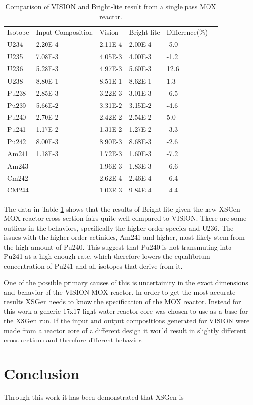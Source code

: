 \documentclass{article}
\begin{document}
\begin{table}[!htb]
\centering
\caption{Comparison of VISION and Bright-lite result from a single pass MOX reactor.}
\label{tab:g}
\begin{tabular}{llllll}
Isotope & Input Composition & Vision & Bright-lite & Difference(\%) \\
U234 & 2.20E-4 & 2.11E-4 & 2.00E-4 & -5.0\\
U235 & 7.08E-3 & 4.05E-3 & 4.00E-3 & -1.2\\
U236 & 5.28E-3 & 4.97E-3 & 5.60E-3 & 12.6\\
U238 & 8.80E-1 & 8.51E-1 & 8.62E-1 & 1.3\\
Pu238 & 2.85E-3 & 3.22E-3 & 3.01E-3 & -6.5\\
Pu239 & 5.66E-2 & 3.31E-2 & 3.15E-2 & -4.6\\
Pu240 & 2.70E-2 & 2.42E-2 & 2.54E-2 & 5.0\\
Pu241 & 1.17E-2 & 1.31E-2 & 1.27E-2 & -3.3\\
Pu242 & 8.00E-3 & 8.90E-3 & 8.68E-3 & -2.6\\
Am241 & 1.18E-3 & 1.72E-3 & 1.60E-3 & -7.2\\
Am243 & - & 1.96E-3 & 1.83E-3 & -6.6\\
Cm242 & - & 2.62E-4 & 2.46E-4 & -6.4\\
CM244 & - & 1.03E-3 & 9.84E-4 & -4.4
\end{tabular}
\end{table}

The data in Table \ref{tab:g} shows that the results of Bright-lite given the new XSGen MOX reactor cross section fairs quite well compared to VISION. There are some outliers in the behaviors, specifically the higher order species and U236. The issues with the higher order actinides, Am241 and higher, most likely stem from the high amount of Pu240. This suggest that Pu240 is not transmuting into Pu241 at a high enough rate, which therefore lowers the equalibrium concentration of Pu241 and all isotopes that derive from it.

One of the possible primary causes of this is uncertainity in the exact dimensions and behavior of the VISION MOX reactor. In order to get the most accurate results XSGen needs to know the specification of the MOX reactor. Instead for this work a generic 17x17 light water reactor core was chosen to use as a base for the XSGen run. If the input and output compositions generated for VISION were made from a reactor core of a different design it would result in slightly different cross sections and therefore different behavior.

\section{Conclusion}
Through this work it has been demonstrated that XSGen is 
\end{document}
